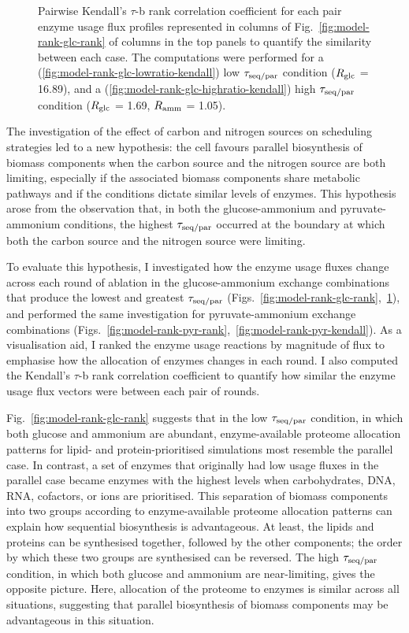 \begin{figure}
  \caption{
    Pairwise Kendall's $\tau$-b rank correlation coefficient for each pair enzyme usage flux profiles represented in columns of Fig.\ \ref{fig:model-rank-glc-rank} of columns in the top panels to quantify the similarity between each case.
    The computations were performed for a (\ref{fig:model-rank-glc-lowratio-kendall}) low $\tau_{\mathrm{seq}/\mathrm{par}}$ condition ($R_{\mathrm{glc}}$ = \SI{16.89}{\mmolgdwh}), and a (\ref{fig:model-rank-glc-highratio-kendall}) high $\tau_{\mathrm{seq}/\mathrm{par}}$ condition ($R_{\mathrm{glc}}$ = \SI{1.69}{\mmolgdwh}, $R_{\mathrm{amm}}$ = \SI{1.05}{\mmolgdwh}).
  }
  \label{fig:model-rank-glc-kendall}
\end{figure}

The investigation of the effect of carbon and nitrogen sources on scheduling strategies led to a new hypothesis: the cell favours parallel biosynthesis of biomass components when the carbon source and the nitrogen source are both limiting, especially if the associated biomass components share metabolic pathways and if the conditions dictate similar levels of enzymes.
This hypothesis arose from the observation that, in both the glucose-ammonium and pyruvate-ammonium conditions, the highest $\tau_{\mathrm{seq}/\mathrm{par}}$ occurred at the boundary at which both the carbon source and the nitrogen source were limiting.

To evaluate this hypothesis, I investigated how the enzyme usage fluxes change across each round of ablation in the glucose-ammonium exchange combinations that produce the lowest and greatest $\tau_{\mathrm{seq}/\mathrm{par}}$ (Figs.\ \ref{fig:model-rank-glc-rank},~\ref{fig:model-rank-glc-kendall}), and performed the same investigation for pyruvate-ammonium exchange combinations (Figs.\ \ref{fig:model-rank-pyr-rank},~\ref{fig:model-rank-pyr-kendall}).
As a visualisation aid, I ranked the enzyme usage reactions by magnitude of flux to emphasise how the allocation of enzymes changes in each round.
I also computed the Kendall's $\tau$-b rank correlation coefficient \parencite{kendallTREATMENTTIESRANKING1945} to quantify how similar the enzyme usage flux vectors were between each pair of rounds.

Fig.\ \ref{fig:model-rank-glc-rank} suggests that in the low $\tau_{\mathrm{seq}/\mathrm{par}}$ condition, in which both glucose and ammonium are abundant, enzyme-available proteome allocation patterns for lipid- and protein-prioritised simulations most resemble the parallel case.
In contrast, a set of enzymes that originally had low usage fluxes in the parallel case became enzymes with the highest levels when carbohydrates, DNA, RNA, cofactors, or ions are prioritised.
This separation of biomass components into two groups according to enzyme-available proteome allocation patterns can explain how sequential biosynthesis is advantageous.
At least, the lipids and proteins can be synthesised together, followed by the other components; the order by which these two groups are synthesised can be reversed.
The high $\tau_{\mathrm{seq}/\mathrm{par}}$ condition, in which both glucose and ammonium are near-limiting, gives the opposite picture.
Here, allocation of the proteome to enzymes is similar across all situations, suggesting that parallel biosynthesis of biomass components may be advantageous in this situation.


